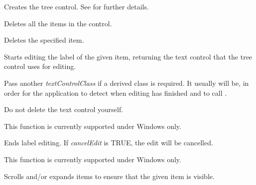 Creates the tree control. See  for further details.

\label{wxtreectrldeleteallitems}


Deletes all the items in the control.

\label{wxtreectrldeleteitem}


Deletes the specified item.

\label{wxtreectrleditlabel}


Starts editing the label of the given item, returning the text control that the tree control uses for editing.

Pass another {\it textControlClass} if a derived class is required. It usually will be, in order for
the application to detect when editing has finished and to call .

Do not delete the text control yourself.

This function is currently supported under Windows only.



\label{wxtreectrlendeditlabel}


Ends label editing. If {\it cancelEdit} is TRUE, the edit will be cancelled.

This function is currently supported under Windows only.



\label{wxtreectrlensurevisible}


Scrolls and/or expands items to ensure that the given item is visible.

\label{wxtreectrlexpanditem}

